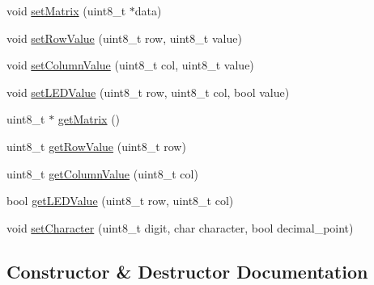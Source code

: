 \begin{DoxyCompactItemize}
\item 
void \hyperlink{class_m_a_x72_x_x_class_a988f905f9eba35cf9cb0c228b2eb8ec1}{set\+Matrix} (uint8\+\_\+t $\ast$data)
\item 
void \hyperlink{class_m_a_x72_x_x_class_a2b2132e9a1cff1b8e8b778d3471998dc}{set\+Row\+Value} (uint8\+\_\+t row, uint8\+\_\+t value)
\item 
void \hyperlink{class_m_a_x72_x_x_class_ae88e0718a2e14dbe3b13a97fb9cf69c2}{set\+Column\+Value} (uint8\+\_\+t col, uint8\+\_\+t value)
\item 
void \hyperlink{class_m_a_x72_x_x_class_ab9b5890541f583c71a6c3f5de5bec780}{set\+L\+E\+D\+Value} (uint8\+\_\+t row, uint8\+\_\+t col, bool value)
\item 
uint8\+\_\+t $\ast$ \hyperlink{class_m_a_x72_x_x_class_abd68209017a0996f6c58a1f03a533134}{get\+Matrix} ()
\item 
uint8\+\_\+t \hyperlink{class_m_a_x72_x_x_class_a5ae308113be0ebc42939de90777f4f52}{get\+Row\+Value} (uint8\+\_\+t row)
\item 
uint8\+\_\+t \hyperlink{class_m_a_x72_x_x_class_a32292c971f4cd78377cb9d0a0ee40f08}{get\+Column\+Value} (uint8\+\_\+t col)
\item 
bool \hyperlink{class_m_a_x72_x_x_class_a4996f2b3403c46c5cf0a85e3fcc40109}{get\+L\+E\+D\+Value} (uint8\+\_\+t row, uint8\+\_\+t col)
\item 
void \hyperlink{class_m_a_x72_x_x_class_a7a1895b4809df7e8d565e74e199e8f05}{set\+Character} (uint8\+\_\+t digit, char character, bool decimal\+\_\+point)
\end{DoxyCompactItemize}


\subsection{Constructor \& Destructor Documentation}
\hypertarget{class_m_a_x72_x_x_class_ab45a341ff4776e620a1b72e5270a7de5}{}
